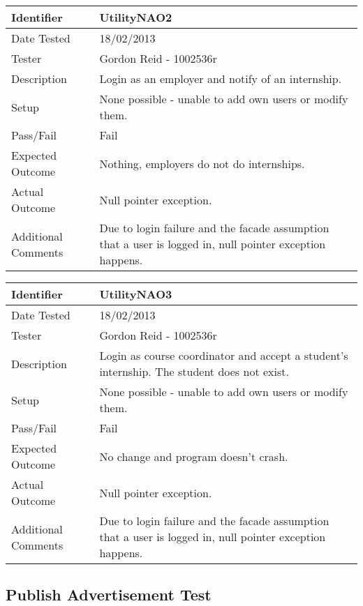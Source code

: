 \documentclass[11pt]{l3deliverable}
\begin{document}
\begin{tabularx}{\textwidth}{|T|L|}
\hline
Identifier & UtilityNAO2\\
\hline
Date Tested & 18/02/2013\\
\hline
Tester & Gordon Reid - 1002536r\\
\hline
Description & Login as an employer and notify of an internship.\\
\hline
Setup & None possible - unable to add own users or modify them.\\
\hline
Pass/Fail & Fail\\
\hline
Expected Outcome & Nothing, employers do not do internships.\\
\hline
Actual Outcome & Null pointer exception.\\
\hline
Additional Comments & Due to login failure and the facade assumption that a
user is logged in, null pointer exception happens.\\
\hline
\end{tabularx}

\vspace{2em}

\begin{tabularx}{\textwidth}{|T|L|}
\hline
Identifier & UtilityNAO3\\
\hline
Date Tested & 18/02/2013\\
\hline
Tester & Gordon Reid - 1002536r\\
\hline
Description & Login as course coordinator and accept a student's internship.
The student does not exist.\\
\hline
Setup & None possible - unable to add own users or modify them.\\
\hline
Pass/Fail & Fail\\
\hline
Expected Outcome & No change and program doesn't crash.\\
\hline
Actual Outcome & Null pointer exception.\\
\hline
Additional Comments & Due to login failure and the facade assumption that a
user is logged in, null pointer exception happens.\\
\hline
\end{tabularx}


\newpage

\subsection{Publish Advertisement Test}
\end{document}
